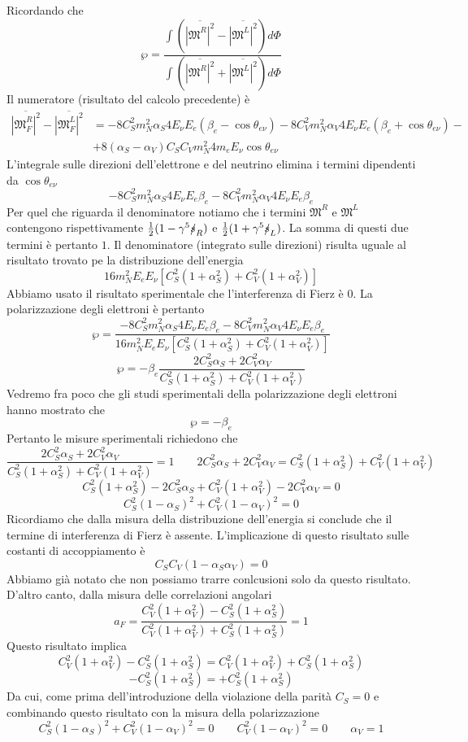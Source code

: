 Ricordando che 
$$
\wp = \frac{\int \left( \overline{|\mathfrak{M}^R|^2} - \overline{|\mathfrak{M}^L|^2} \right) d\Phi}{\int \left( \overline{|\mathfrak{M}^R|^2} + \overline{|\mathfrak{M}^L|^2} \right) d\Phi}
$$
Il numeratore (risultato del calcolo precedente) è
$$
\begin{aligned}
	\overline{|\mathfrak{M}_F^R|^2} - \overline{|\mathfrak{M}_F^L|^2} &= -8C_S^2 m_N^2 \alpha_S 4E_\nu E_e (\beta_e - \cos \theta_{e\nu}) - 8C_V^2 m_N^2 \alpha_V 4E_\nu E_e (\beta_e + \cos \theta_{e\nu}) - \\
	&+ 8(\alpha_S - \alpha_V) C_S C_V m_N^2 4m_e E_\nu \cos \theta_{e\nu}
\end{aligned}
$$
L'integrale sulle direzioni dell'elettrone e del neutrino elimina i termini dipendenti da $\cos{\theta_{e\nu}}$
$$
-8C_S^2 m_N^2 \alpha_S 4E_\nu E_e \beta_e - 8C_V^2 m_N^2 \alpha_V 4E_\nu E_e \beta_e
$$
Per quel che riguarda il denominatore notiamo che i termini $\mathfrak{M}^R$ e $\mathfrak{M}^L$ contengono rispettivamente $\frac{1}{2}(1-\gamma^5\slashed{s}_R)$ e $\frac{1}{2}(1+\gamma^5\slashed{s}_L)$. La somma di questi due termini è pertanto $1$. Il denominatore (integrato sulle direzioni) risulta uguale al risultato trovato pe la distribuzione dell'energia
$$
16m_N^2 E_e E_\nu [ C_S^2 (1 + \alpha_S^2) + C_V^2 (1 + \alpha_V^2) ]
$$
Abbiamo usato il risultato sperimentale che l'interferenza di Fierz è 0. La polarizzazione degli elettroni è pertanto
$$
\wp = \frac{-8C_S^2 m_N^2 \alpha_S 4E_\nu E_e \beta_e - 8C_V^2 m_N^2 \alpha_V 4E_\nu E_e \beta_e}{16m_N^2 E_e E_\nu \left[ C_S^2 (1 + \alpha_S^2) + C_V^2 (1 + \alpha_V^2) \right]}
$$
$$
\wp = -\beta_e \frac{2C_S^2 \alpha_S + 2C_V^2 \alpha_V}{C_S^2 (1 + \alpha_S^2) + C_V^2 (1 + \alpha_V^2)}
$$
Vedremo fra poco che gli studi sperimentali della polarizzazione degli elettroni hanno mostrato che
$$
\wp=-\beta_e
$$
Pertanto le misure sperimentali richiedono che
$$
\frac{2C_S^2 \alpha_S + 2C_V^2 \alpha_V}{C_S^2 (1 + \alpha_S^2) + C_V^2 (1 + \alpha_V^2)} = 1 \qquad 2C_S^2 \alpha_S + 2C_V^2 \alpha_V = C_S^2 (1 + \alpha_S^2) + C_V^2 (1 + \alpha_V^2)
$$
$$
C_S^2 (1 + \alpha_S^2) - 2C_S^2 \alpha_S + C_V^2 (1 + \alpha_V^2) - 2C_V^2 \alpha_V = 0
$$
$$
C_S^2 (1 - \alpha_S)^2 + C_V^2 (1 - \alpha_V)^2 = 0
$$
Ricordiamo che dalla misura della distribuzione dell'energia si conclude che il termine di interferenza di Fierz è assente. L'implicazione di questo risultato sulle costanti di accoppiamento è
$$
C_S C_V (1 - \alpha_S \alpha_V) = 0
$$
Abbiamo già notato che non possiamo trarre conlcusioni solo da questo risultato. D'altro canto, dalla misura delle correlazioni angolari
$$
a_F = \frac{C_V^2 (1 + \alpha_V^2) - C_S^2 (1 + \alpha_S^2)}{C_V^2 (1 + \alpha_V^2) + C_S^2 (1 + \alpha_S^2)} = 1
$$
Questo risultato implica
$$
C_V^2 (1 + \alpha_V^2) - C_S^2 (1 + \alpha_S^2) = C_V^2 (1 + \alpha_V^2) + C_S^2 (1 + \alpha_S^2)
$$
$$
-C_S^2 (1 + \alpha_S^2) = +C_S^2 (1 + \alpha_S^2)
$$
Da cui, come prima dell'introduzione della violazione della parità $C_S=0$ e combinando questo risultato con la misura della polarizzazione
$$
C_S^2 (1 - \alpha_S)^2 + C_V^2 (1 - \alpha_V)^2 = 0 \qquad C_V^2 (1 - \alpha_V)^2 = 0 \qquad \alpha_V=1
$$